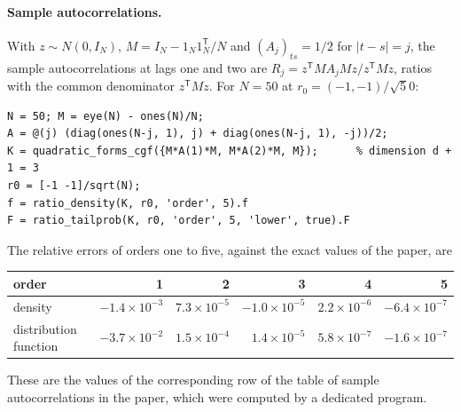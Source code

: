 \documentclass[11pt]{article}
\newcommand{\tp}{^{\mathsf T}}
\begin{document}
\paragraph{Sample autocorrelations.} With $z\sim N(0,I_N)$, $M=I_N-1_N1_N\tp/N$ and
$(A_j)_{ts}=1/2$ for $|t-s|=j$, the sample autocorrelations at lags one and two are
$R_j=z\tp MA_jMz/z\tp Mz$, ratios with the common denominator $z\tp Mz$. For $N=50$ at
$r_0=(-1,-1)/\surd50$:
\begin{lstlisting}
N = 50; M = eye(N) - ones(N)/N;
A = @(j) (diag(ones(N-j, 1), j) + diag(ones(N-j, 1), -j))/2;
K = quadratic_forms_cgf({M*A(1)*M, M*A(2)*M, M});      % dimension d + 1 = 3
r0 = [-1 -1]/sqrt(N);
f = ratio_density(K, r0, 'order', 5).f
F = ratio_tailprob(K, r0, 'order', 5, 'lower', true).F
\end{lstlisting}
The relative errors of orders one to five, against the exact values of the paper, are
\begin{center}
\begin{tabular}{lrrrrr}
\toprule
order & 1 & 2 & 3 & 4 & 5\\
\midrule
density & $-1.4\times10^{-3}$ & $7.3\times10^{-5}$ & $-1.0\times10^{-5}$ & $2.2\times10^{-6}$ & $-6.4\times10^{-7}$\\
distribution function & $-3.7\times10^{-2}$ & $1.5\times10^{-4}$ & $1.4\times10^{-5}$ & $5.8\times10^{-7}$ & $-1.6\times10^{-7}$\\
\bottomrule
\end{tabular}
\end{center}
These are the values of the corresponding row of the table of sample autocorrelations in the paper,
which were computed by a dedicated program.
\end{document}
